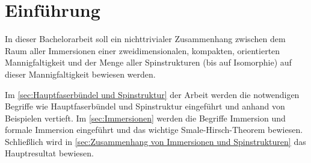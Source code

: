 \section*{Einführung}

In dieser Bachelorarbeit soll ein nichttrivialer Zusammenhang zwischen
dem Raum aller Immersionen einer zweidimensionalen, kompakten, orientierten Mannigfaltigkeit und der Menge aller Spinstrukturen (bis auf Isomorphie) auf dieser Mannigfaltigkeit
bewiesen werden.



Im \autoref{sec:Hauptfaserbündel und Spinstruktur} der Arbeit werden die notwendigen Begriffe wie Hauptfaserbündel und Spinstruktur eingeführt und anhand von Beispielen vertieft.
Im \autoref{sec:Immersionen} werden die Begriffe Immersion und formale Immersion eingeführt und das wichtige Smale-Hirsch-Theorem
bewiesen. Schließlich wird in \autoref{sec:Zusammenhang von Immersionen und Spinstrukturen} das Hauptresultat bewiesen.
